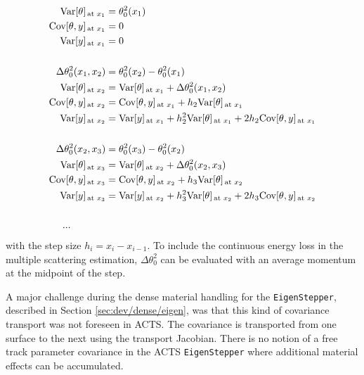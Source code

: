 \begin{equation}
\begin{split}
    \text{Var}[\theta]_\text{\,at $x_1$} &= \theta_0^2(x_1) \\
    \text{Cov}[\theta,y]_\text{\,at $x_1$} &= 0 \\
    \text{Var}[y]_\text{\,at $x_1$} &= 0 \\
    \\
    \Delta\theta_0^2(x_1,x_2) &= \theta_0^2(x_2) - \theta_0^2(x_1) \\
    \text{Var}[\theta]_\text{\,at $x_2$} &= \text{Var}[\theta]_\text{\,at $x_1$} + \Delta\theta_0^2(x_1,x_2) \\
    \text{Cov}[\theta,y]_\text{\,at $x_2$} &= \text{Cov}[\theta,y]_\text{\,at $x_1$} + h_2 \text{Var}[\theta]_\text{\,at $x_1$} \\
    \text{Var}[y]_\text{\,at $x_2$} &= \text{Var}[y]_\text{\,at $x_1$} + h_2^2 \text{Var}[\theta]_\text{\,at $x_1$} + 2 h_2 \text{Cov}[\theta,y]_\text{\,at $x_1$} \\
    \\
    \Delta\theta_0^2(x_2,x_3) &= \theta_0^2(x_3) - \theta_0^2(x_2) \\
    \text{Var}[\theta]_\text{\,at $x_3$} &= \text{Var}[\theta]_\text{\,at $x_2$} + \Delta\theta_0^2(x_2,x_3) \\
    \text{Cov}[\theta,y]_\text{\,at $x_3$} &= \text{Cov}[\theta,y]_\text{\,at $x_2$} + h_3 \text{Var}[\theta]_\text{\,at $x_2$} \\
    \text{Var}[y]_\text{\,at $x_3$} &= \text{Var}[y]_\text{\,at $x_2$} + h_3^2 \text{Var}[\theta]_\text{\,at $x_2$} + 2 h_3 \text{Cov}[\theta,y]_\text{\,at $x_2$} \\
    \\
    \text{...} \quad\quad\quad\;\; &
\end{split}
\label{eq:dev/dense/split-var-iter}
\end{equation}
with the step size $h_i = x_i - x_{i-1}$. To include the continuous energy loss in the multiple scattering estimation, $\Delta\theta_0^2$ can be evaluated with an average momentum at the midpoint of the step.

A major challenge during the dense material handling for the \texttt{EigenStepper}, described in Section \ref{sec:dev/dense/eigen}, was that this kind of covariance transport was not foreseen in ACTS. The covariance is transported from one surface to the next using the transport Jacobian. There is no notion of a free track parameter covariance in the ACTS \texttt{EigenStepper} where additional material effects can be accumulated.

